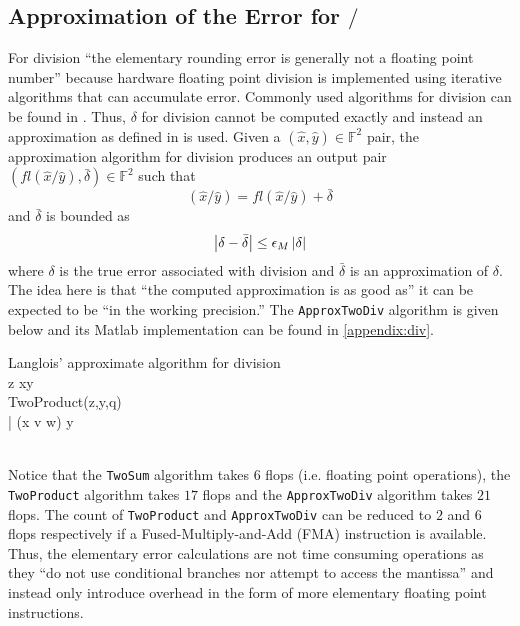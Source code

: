 \documentclass{standalone}
\begin{document}
	\subsection{Approximation of the Error for $/$}
	For division ``the elementary rounding error is generally not a floating point number'' \cite{langlois2005solving} because hardware floating point division is implemented using iterative algorithms that can accumulate error. Commonly used algorithms for division can be found in \cite{behrooz2000computer}. Thus, $\delta$ for division cannot be computed exactly and instead an approximation as defined in \cite{langlois2005solving} is used. Given a $(\hat{x},\hat{y})\in\mathbb{F}^{2}$ pair, the approximation algorithm for division produces an output pair $(fl(\hat{x}/\hat{y}),\bar{\delta})\in\mathbb{F}^{2}$ such that$$(\hat{x}/\hat{y})=fl(\hat{x}/\hat{y})+\bar{\delta}$$and $\bar{\delta}$ is bounded as$$\left|\delta-\bar{\delta}\right|\le\epsilon_{M}\left|\delta\right|$$where $\delta$ is the true error associated with division and $\bar{\delta}$ is an approximation of $\delta$. The idea here is that ``the computed approximation is as good as'' it can be expected to be ``in the working precision.'' \cite{langlois2005solving} The \texttt{ApproxTwoDiv} algorithm is given below and its Matlab implementation can be found in \ref{appendix:div}.
	\newline
	\begin{minipage}[t][2.0in][t]{6.5in}
	\begin{pseudocode}{Langlois' approximate algorithm for division}{\:}
		\\
			z \GETS x\oslash y\\
			 \GETS TwoProduct(z,y,q)\\
			\bar{\delta} \GETS (x \ominus v \ominus w) \oslash y\\
			\\
		\ENDPROCEDURE
	\end{pseudocode}
	\end{minipage}
	\par
	Notice that the \texttt{TwoSum} algorithm takes $6$ flops (i.e. floating point operations), the \texttt{TwoProduct} algorithm takes $17$ flops and the \texttt{ApproxTwoDiv} algorithm takes $21$ flops. The count of \texttt{TwoProduct} and \texttt{ApproxTwoDiv} can be reduced to $2$ and $6$ flops respectively if a Fused-Multiply-and-Add (FMA) instruction is available. Thus, the elementary error calculations are not time consuming operations as they ``do not use conditional branches nor attempt to access the mantissa'' and instead only introduce overhead in the form of more elementary floating point instructions. \cite{langlois2005solving}
\end{document}
